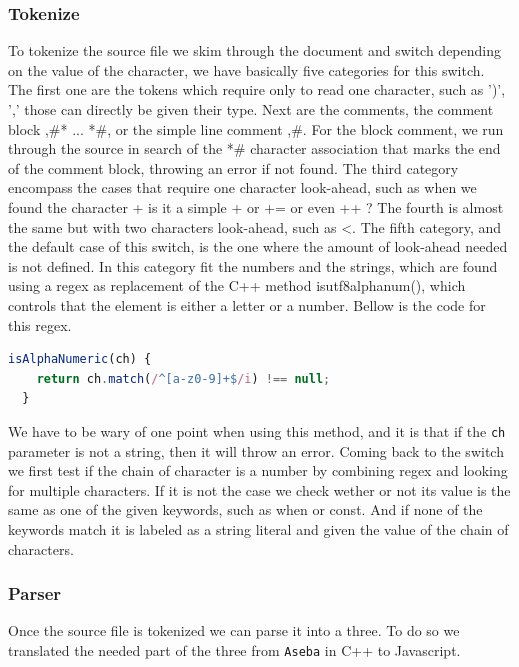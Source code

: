 \documentclass{scrartcl}
\begin{document}
\subsubsection{Tokenize}

To tokenize the source file we skim through the document and switch depending on the value of the character, we have basically five categories for this switch.
The first one are the tokens which require only to read one character, such as ')', ',' those can directly be given their type. Next are the comments, the comment block ,\#* ... *\#, or the simple line comment ,\#. For the block comment,
we run through the source in search of the *\# character association that marks the end of the comment block, throwing an error if not found. The third category encompass the cases that require one character look-ahead, such as when we found
the character + is it a simple + or += or even ++ ? The fourth is almost the same but with two characters look-ahead, such as <. The fifth category, and the default case of this switch, is the one where the amount of look-ahead needed is not defined.
In this category fit the numbers and the strings, which are found using a regex as replacement of the C++ method is\textunderscore utf8\textunderscore alpha\textunderscore num(), which controls that the element is either a letter or a number. Bellow is 
the code for this regex.
\begin{lstlisting}[language=JavaScript, basicstyle=\ttfamily\small]
  isAlphaNumeric(ch) {
    return ch.match(/^[a-z0-9]+$/i) !== null;
  }
\end{lstlisting}  
We have to be wary of one point when using this method, and it is that if the \texttt{ch} parameter is not a string, then it will throw an error. Coming back to the switch we first test if the chain of character is a number by combining regex and looking for multiple characters.
If it is not the case we check wether or not its value is the same as one of the given keywords, such as when or const. And if none of the keywords match it is labeled as a string literal and given the value of the chain of characters.

\subsubsection{Parser}

Once the source file is tokenized we can parse it into a three. To do so we translated the needed part of the three from \texttt{Aseba} in C++ to Javascript.
\end{document}
